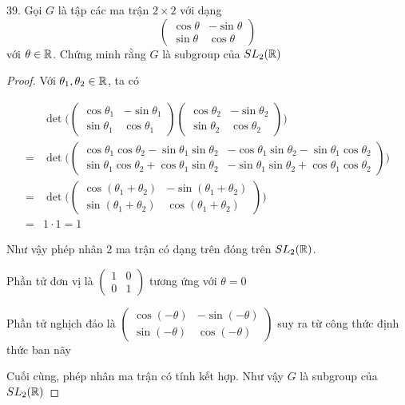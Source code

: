39. Gọi $G$ là tập các ma trận $2 \times 2$ với dạng
$$\begin{pmatrix}
    \cos \theta & -\sin \theta \\ \sin \theta & \cos \theta
\end{pmatrix}$$ với $\theta \in \mathbb{R}$. Chứng minh rằng $G$ là subgroup của $SL_2 (\mathbb{R})$
    
\begin{proof}
            Với $\theta_1, \theta_2 \in \mathbb{R}$, ta có
        
        \begin{align*}
        & \det \Bigg( \begin{pmatrix}
            \cos \theta_1 & -\sin \theta_1 \\ \sin \theta_1 & \cos \theta_1
        \end{pmatrix} \begin{pmatrix}
            \cos \theta_2 & -\sin \theta_2 \\ \sin \theta_2 & \cos \theta_2
        \end{pmatrix} \Bigg) \\
        = & \det\Bigg(\begin{pmatrix}
            \cos \theta_1 \cos \theta_2 - \sin \theta_1 \sin \theta_2 & -\cos \theta_1 \sin \theta_2 - \sin \theta_1 \cos \theta_2 \\ 
            \sin \theta_1 \cos \theta_2 + \cos \theta_1 \sin \theta_2 & -\sin \theta_1 \sin \theta_2 + \cos \theta_1 \cos \theta_2
        \end{pmatrix}\Bigg) \\
        = & \det \Bigg( \begin{pmatrix}
            \cos (\theta_1 + \theta_2) & -\sin (\theta_1 + \theta_2) \\
            \sin (\theta_1 + \theta_2) & \cos (\theta_1 + \theta_2)
        \end{pmatrix} \Bigg) \\
        = & 1 \cdot 1 = 1
        \end{align*}
        
        Như vậy phép nhân 2 ma trận có dạng trên đóng trên $SL_2 (\mathbb{R})$.
        
        Phần tử đơn vị là $\begin{pmatrix}
        1 & 0 \\ 0 & 1
        \end{pmatrix}$ tương ứng với $\theta = 0$
        
        Phần tử nghịch đảo là $\begin{pmatrix}
        \cos (-\theta) & -\sin (-\theta) \\ \sin (-\theta) & \cos (-\theta)
        \end{pmatrix}$ suy ra từ công thức định thức ban nãy
        
        Cuối cùng, phép nhân ma trận có tính kết hợp. Như vậy $G$ là subgroup của $SL_2 (\mathbb{R})$
        
\end{proof}

